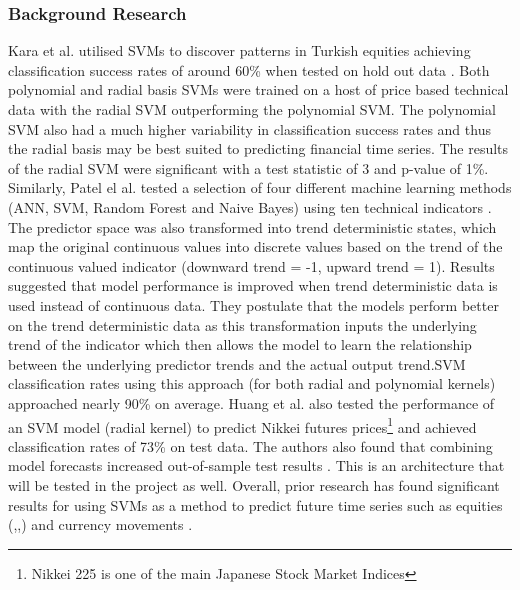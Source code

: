 \documentclass[11pt]{article}
\begin{document}
\subsubsection{Background Research}
 Kara et al. utilised SVMs to discover patterns in Turkish equities achieving classification success rates of around 60\% when tested on hold out data \cite{Kara2011}. Both polynomial and radial basis SVMs were trained on a host of price based technical data with the radial SVM outperforming the polynomial SVM. The polynomial SVM also had a much higher variability in classification success rates and thus the radial basis may be best suited to predicting financial time series. The results of the radial SVM were significant with a test statistic of 3 and p-value of 1\%. 
\newline Similarly, Patel el al. tested a selection of four different machine learning methods (ANN, SVM, Random Forest and Naive Bayes) using ten technical indicators \cite{Patel2015}. The predictor space was also transformed into trend deterministic states, which map the original continuous values into discrete values based on the trend of the continuous valued indicator (downward trend = -1, upward trend = 1). Results suggested that model performance is improved when trend deterministic data is used instead of continuous data. They postulate that the models perform better on the trend deterministic data as this transformation inputs the underlying trend of the indicator which then allows the model to learn the relationship between the underlying predictor trends and the actual output trend.\newline SVM classification rates using this approach (for both radial and polynomial kernels) approached nearly 90\% on average.
Huang et al. also tested the performance of an SVM model (radial kernel) to predict Nikkei futures prices\footnote{Nikkei 225 is one of the main Japanese Stock Market Indices} and achieved classification rates of 73\% on test data. The authors also found that combining model forecasts increased out-of-sample test results \cite{Huang2005}. This is an architecture that will be tested in the project as well.
Overall, prior research has found significant results for using SVMs as a method to predict future time series such as equities (\cite{Gui2015},\cite{Shen2012},\cite{Kim2003}) and currency movements \cite{Kamruzzaman2004}.
\end{document}
